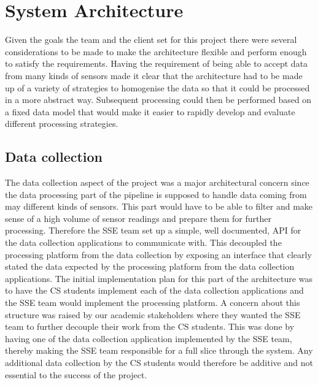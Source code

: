\documentclass[prodmode,acmtosem]{acmsmall} %
\begin{document}
\section{System Architecture}
\label{architecture}
Given the goals the team and the client set for this project there were several considerations to be made to make the architecture flexible and perform enough to satisfy the requirements. Having the requirement of being able to accept data from many kinds of sensors made it clear that the architecture had to be made up of a variety of strategies to homogenise the data so that it could be processed in a more abstract way. Subsequent processing could then be performed based on a fixed data model that would make it easier to rapidly develop and evaluate different processing strategies.

\subsection{Data collection}
\label{dataCollection}
The data collection aspect of the project was a major architectural concern since the data processing part of the pipeline is supposed to handle data coming from may different kinds of sensors. This part would have to be able to filter and make sense of a high volume of sensor readings and prepare them for further processing. Therefore the SSE team set up a simple, well documented, API for the data collection applications to communicate with. This decoupled the processing platform from the data collection by exposing an interface that clearly stated the data expected by the processing platform from the data collection applications.
The initial implementation plan for this part of the architecture was to have the CS students implement each of the data collection applications and the SSE team would implement the processing platform.
A concern about this structure was raised by our academic stakeholders where they wanted the SSE team to further decouple their work from the CS students. This was done by having one of the data collection application implemented by the SSE team, thereby making the SSE team responsible for a full slice through the system. Any additional data collection by the CS students would therefore be additive and not essential to the success of the project.
\end{document}
